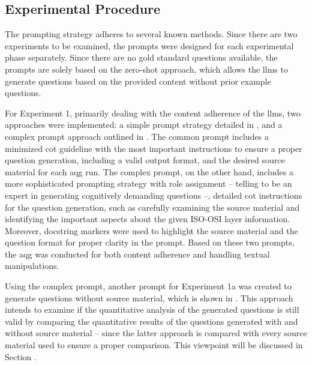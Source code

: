 \subsection{Experimental Procedure}

The prompting strategy adheres to several known methods. Since there are two experiments to be examined, the prompts were designed for each experimental phase separately. Since there are no gold standard questions available, the prompts are solely based on the zero-shot approach, which allows the \acp{llm} to generate questions based on the provided content without prior example questions.

For Experiment 1, primarily dealing with the content adherence of the \acp{llm}, two approaches were implemented: a simple prompt strategy detailed in , and a complex prompt approach outlined in . The common prompt includes a minimized \ac{cot} guideline with the most important instructions to ensure a proper question generation, including a valid output format, and the desired source material for each \ac{aqg} run. The complex prompt, on the other hand, includes a more sophisticated prompting strategy with role assignment -- telling to be an expert in generating cognitively demanding questions --, detailed \ac{cot} instructions for the question generation, such as carefully examining the source material and identifying the important aspects about the given ISO-OSI layer information. Moreover, docstring markers were used to highlight the source material and the question format for proper clarity in the prompt. Based on these two prompts, the \ac{aqg} was conducted for both content adherence and handling textual manipulations. 

Using the complex prompt, another prompt for Experiment 1a was created to generate questions without source material, which is shown in . This approach intends to examine if the quantitative analysis of the generated questions is still valid by comparing the quantitative results of the questions generated with and without source material -- since the latter approach is compared with every source material used to ensure a proper comparison. This viewpoint will be discussed in Section .

